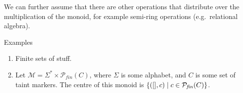 We can further assume that there are other operations that distribute
over the multiplication of the monoid, for example semi-ring
operations (e.g.~relational algebra).

Examples
\begin{enumerate}
\item Finite sets of stuff.
\item Let $\mathcal{M} = \Sigma^* \times
  \mathcal{P}_{\mathit{fin}}(C)$, where $\Sigma$ is some alphabet, and
  $C$ is some set of taint markers. The centre of this monoid is
  $\{([], c) \mathrel| c \in \mathcal{P}_{\mathit{fin}}(C) \}$.
\end{enumerate}

